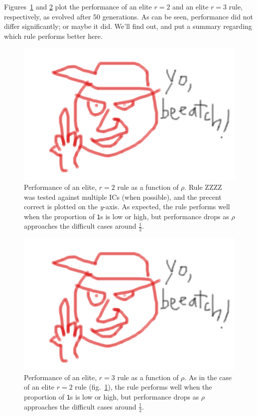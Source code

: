 Figures~\ref{fig:r2_rho} and \ref{fig:r3_rho} plot the performance of an elite $r = 2$ and an elite $r = 3$ rule, respectively, as evolved after 50 generations. As can be seen, performance did not differ significantly; or maybe it did. We'll find out, and put a summary regarding which rule performs better here.

\begin{figure}
\begin{center}
\includegraphics[width=\linewidth]{foo.png}
\caption{Performance of an elite, $r = 2$ rule as a function of $\rho$. Rule ZZZZ was tested against multiple ICs (when possible), and the precent correct is plotted on the \textit{y}-axis. As expected, the rule performs well when the proportion of \texttt{1}s is 
low or high, but performance drops as $\rho$ approaches the difficult cases around $\frac{1}{2}$.}
\label{fig:r2_rho}
\end{center}
\end{figure}
\begin{figure} [h]
\begin{center}
\includegraphics[width=\linewidth]{foo.png}
\caption{Performance of an elite, $r = 3$ rule as a function of $\rho$. As in the case of an elite $r = 2$ rule (fig.~\ref{fig:r2_rho}), the rule performs well when the proportion of \texttt{1}s is 
low or high, but performance drops as $\rho$ approaches the difficult cases around $\frac{1}{2}$.}
\label{fig:r3_rho}
\end{center}
\end{figure}

